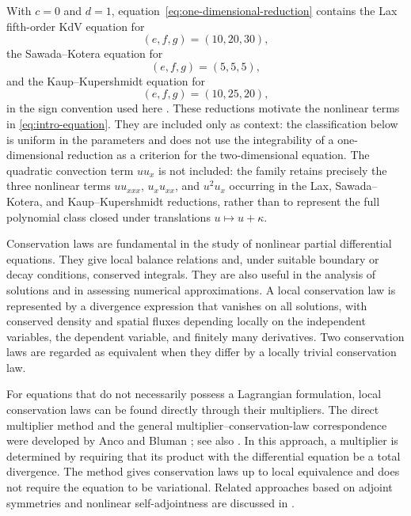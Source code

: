 \documentclass[11pt]{article}
\numberwithin{equation}{section}
\theoremstyle{definition}
\theoremstyle{remark}
\begin{document}
With $c=0$ and $d=1$, equation~\eqref{eq:one-dimensional-reduction}
contains the Lax fifth-order KdV equation for
\begin{equation*}
(e,f,g)=(10,20,30),
\end{equation*}
the Sawada--Kotera equation for
\begin{equation*}
(e,f,g)=(5,5,5),
\end{equation*}
and the Kaup--Kupershmidt equation for
\begin{equation*}
(e,f,g)=(10,25,20),
\end{equation*}
in the sign convention used here
\cite{Lax1968,SawadaKotera1974,Kaup1980,Kupershmidt1985}.
These reductions motivate the nonlinear terms in
\eqref{eq:intro-equation}. They are included only as context: the
classification below is uniform in the parameters and does not use
the integrability of a one-dimensional reduction as a criterion for
the two-dimensional equation. The quadratic convection term $u u_x$ is not included:
the family retains precisely the three nonlinear terms
$u u_{xxx}$, $u_x u_{xx}$, and $u^2 u_x$ occurring in the Lax,
Sawada--Kotera, and Kaup--Kupershmidt reductions, rather than to
represent the full polynomial class closed under translations
$u \mapsto u+\kappa$.


Conservation laws are fundamental in the study of nonlinear partial
differential equations. They give local balance relations and, under
suitable boundary or decay conditions, conserved integrals. They are
also useful in the analysis of solutions and in assessing numerical
approximations. A local conservation law is represented by a
divergence expression that vanishes on all solutions, with conserved
density and spatial fluxes depending locally on the independent
variables, the dependent variable, and finitely many derivatives.
Two conservation laws are regarded as equivalent when they differ by
a locally trivial conservation law.

For equations that do not necessarily possess a Lagrangian
formulation, local conservation laws can be found directly through
their multipliers. The direct multiplier method and the general
multiplier--conservation-law correspondence were developed by Anco
and Bluman
\cite{AncoBluman2002a,AncoBluman2002b}; see also
\cite{BlumanCheviakovAnco2010,Olver1993}. In this approach, a
multiplier is determined by requiring that its product with the
differential equation be a total divergence. The method gives
conservation laws up to local equivalence and does not require the
equation to be variational. Related approaches based on adjoint
symmetries and nonlinear self-adjointness are discussed in
\cite{Ibragimov2011,IbragimovAvdonina2013,Ma2018}.
\end{document}
